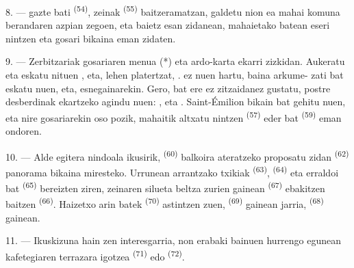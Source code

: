 8. ---  gazte bati \textsuperscript{(54)}, zeinak  \textsuperscript{(55)} baitzeramatzan, galdetu nion ea mahai komuna
berandaren azpian zegoen, eta baietz esan zidanean, mahaietako batean eseri
nintzen eta gosari bikaina eman zidaten.


\VUsaut{4.0mm}
\VUsaut{3.0mm}

9. --- Zerbitzariak gosariaren menua (*) eta ardo-karta ekarri zizkidan. Aukeratu
eta eskatu nituen  
, eta, lehen platertzat, .
 ez nuen hartu, baina arkume- zati bat eskatu nuen,
eta,  esnegainarekin. Gero,  bat ere ez zitzaidanez gustatu, postre desberdinak ekartzeko agindu
nuen: ,  eta . Saint-Émilion
 bikain bat gehitu nuen, eta nire gosariarekin oso pozik, mahaitik
altxatu nintzen  \textsuperscript{(57)} 
eder bat \textsuperscript{(59)} eman ondoren.

10. --- Alde egitera nindoala ikusirik, 
\textsuperscript{(60)} balkoira ateratzeko proposatu zidan 
\textsuperscript{(62)} panorama bikaina miresteko. Urrunean arrantzako
 txikiak \textsuperscript{(63)}, 
\textsuperscript{(64)} eta  erraldoi bat
\textsuperscript{(65)} bereizten ziren, zeinaren silueta beltza 
zurien gainean \textsuperscript{(67)} ebakitzen baitzen 
\textsuperscript{(66)}. Haizetxo arin batek 
\textsuperscript{(70)} astintzen zuen, 
\textsuperscript{(69)} gainean jarria, 
\textsuperscript{(68)} gainean.

\VUsaut{3.0mm}
\VUsaut{3.0mm}

11. --- Ikuskizuna hain zen interesgarria, non erabaki bainuen hurrengo egunean
kafetegiaren terrazara igotzea 
\textsuperscript{(71)} edo  \textsuperscript{(72)}.

